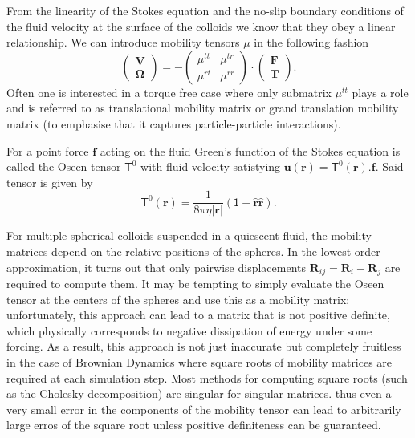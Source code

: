 \documentclass{doctoral}
\newcommand{\mm}[1]{\bm{\mathsf{#1}}} %
\begin{document}
From the linearity of the Stokes equation and the no-slip boundary conditions of the fluid velocity at the surface of the colloids we know that they obey a linear relationship.
We can introduce mobility tensors $\mm{\mu}$ in the following fashion
\begin{equation}
    \begin{pmatrix}
        \bm{V} \\
        \bm{\Omega}
    \end{pmatrix}
    = -
    \begin{pmatrix}
        \mm{\mu}^{tt} & \mm{\mu}^{tr} \\
        \mm{\mu}^{rt} & \mm{\mu}^{rr}
    \end{pmatrix}
    \cdot
    \begin{pmatrix}
        \bm{F} \\
        \bm{T}
    \end{pmatrix}
    .
    \label{eqn:mobility-matrix-definition}
\end{equation}
Often one is interested in a torque free case where only submatrix $\mm{\mu}^{tt}$ plays a role and is referred to as translational mobility matrix or grand translation mobility matrix (to emphasise that it captures particle-particle interactions).

For a point force $\bm{f}$ acting on the fluid Green's function of the Stokes equation is called the Oseen tensor $\mm{T}^0$ with fluid velocity satistying $\bm{u}(\bm{r}) = \mm{T}^{0}(\bm{r}).
    \bm{f}$.
Said tensor is given by
\begin{equation}
    \mm{T}^{0}(\bm{r}) = \frac{1}{8\pi\eta |\bm{r}|} \left( \mm{1} + \bm{\hat{r}}\bm{\hat{r}}\right).
\end{equation}

For multiple spherical colloids suspended in a quiescent fluid, the mobility matrices depend on the relative positions of the spheres.
In the lowest order approximation, it turns out that only pairwise displacements $\bm{R}_{ij} = \bm{R}_i - \bm{R}_j$ are required to compute them.
It may be tempting to simply evaluate the Oseen tensor at the centers of the spheres and use this as a mobility matrix; unfortunately, this approach can lead to a matrix that is not positive definite, which physically corresponds to negative dissipation of energy under some forcing.
As a result, this approach is not just inaccurate but completely fruitless in the case of Brownian Dynamics where square roots of mobility matrices are required at each simulation step.
Most methods for computing square roots (such as the Cholesky decomposition) are singular for singular matrices.
thus even a very small error in the components of the mobility tensor can lead to arbitrarily large erros of the square root unless positive definiteness can be guaranteed.
\end{document}
